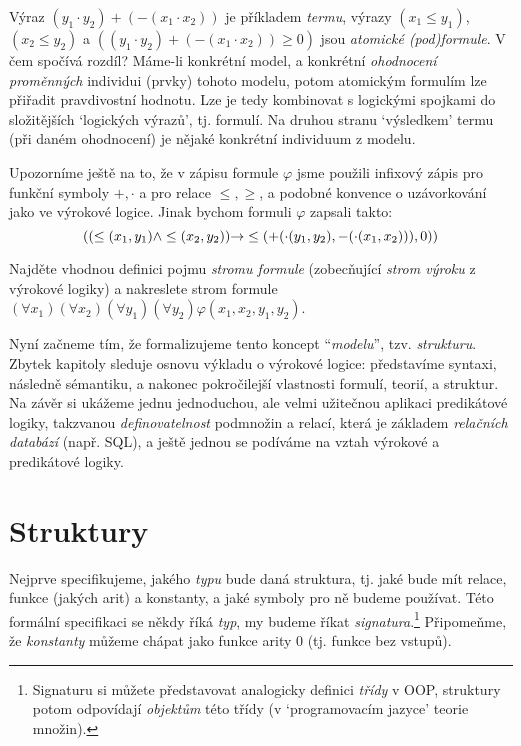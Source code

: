 Výraz $(y_1 \cdot y_2)+(-(x_1\cdot x_2))$ je příkladem \emph{termu}, výrazy $(x_1\leq y_1)$, $(x_2\leq y_2)$ a $((y_1 \cdot y_2)+(-(x_1\cdot x_2))\geq 0)$ jsou \emph{atomické (pod)formule}. V čem spočívá rozdíl? Máme-li konkrétní model, a konkrétní \emph{ohodnocení proměnných} individui (prvky) tohoto modelu, potom atomickým formulím lze přiřadit pravdivostní hodnotu. Lze je tedy kombinovat s logickými spojkami do složitějších `logických výrazů', tj. formulí. Na druhou stranu `výsledkem' termu (při daném ohodnocení) je nějaké konkrétní individuum z modelu.

Upozorníme ještě na to, že v zápisu formule $\varphi$ jsme použili infixový zápis pro funkční symboly $+,\cdot$ a pro relace $\leq,\geq$, a podobné konvence o uzávorkování jako ve výrokové logice. Jinak bychom formuli $\varphi$ zapsali takto:
$$
((\leq (x_1,y_1) \land \leq(x_2,y_2))\mathbin{\rightarrow} \leq(+(\cdot (y_1,y_2),-(\cdot(x_1,x_2))),0))
$$


\begin{exercise}
Najděte vhodnou definici pojmu \emph{stromu formule} (zobecňující \emph{strom výroku} z výrokové logiky) a nakreslete strom formule $(\forall x_1)(\forall x_2)(\forall y_1)(\forall y_2)\varphi(x_1,x_2,y_1,y_2)$.
\end{exercise}



Nyní začneme tím, že formalizujeme tento koncept ``\emph{modelu}'', tzv. \emph{strukturu}. Zbytek kapitoly sleduje osnovu výkladu o výrokové logice: představíme syntaxi, následně sémantiku, a nakonec pokročilejší vlastnosti formulí, teorií, a struktur. Na závěr si ukážeme jednu jednoduchou, ale velmi užitečnou aplikaci predikátové logiky, takzvanou \emph{definovatelnost} podmnožin a relací, která je základem \emph{relačních databází} (např. SQL), a ještě jednou se podíváme na vztah výrokové a predikátové logiky.

\section{Struktury}

Nejprve specifikujeme, jakého \emph{typu} bude daná struktura, tj. jaké bude mít relace, funkce (jakých arit) a konstanty, a jaké symboly pro ně budeme používat. Této formální specifikaci se někdy říká \emph{typ}, my budeme říkat \emph{signatura}.\footnote{Signaturu si můžete představovat analogicky definici \emph{třídy} v OOP, struktury potom odpovídají \emph{objektům} této třídy (v `programovacím jazyce' teorie množin).} Připomeňme, že \emph{konstanty} můžeme chápat jako funkce arity 0 (tj. funkce bez vstupů).

